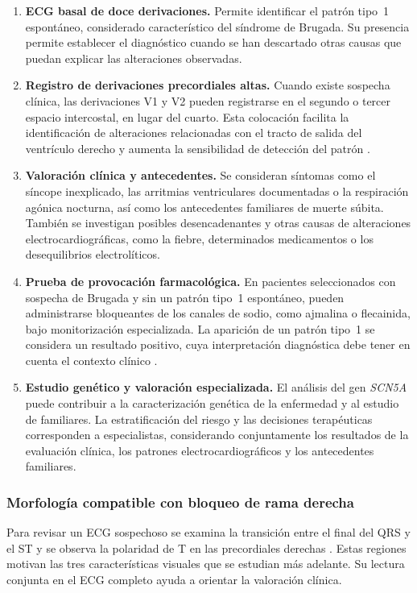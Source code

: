 \begin{enumerate}
  \item \textbf{ECG basal de doce derivaciones.} Permite identificar el patrón tipo~1 espontáneo, considerado característico del síndrome de Brugada. Su presencia permite establecer el diagnóstico cuando se han descartado otras causas que puedan explicar las alteraciones observadas.
  \item \textbf{Registro de derivaciones precordiales altas.} Cuando existe sospecha clínica, las derivaciones V1 y V2 pueden registrarse en el segundo o tercer espacio intercostal, en lugar del cuarto. Esta colocación facilita la identificación de alteraciones relacionadas con el tracto de salida del ventrículo derecho y aumenta la sensibilidad de detección del patrón \cite{zeppenfeld2022}.
  \item \textbf{Valoración clínica y antecedentes.} Se consideran síntomas como el síncope inexplicado, las arritmias ventriculares documentadas o la respiración agónica nocturna, así como los antecedentes familiares de muerte súbita. También se investigan posibles desencadenantes y otras causas de alteraciones electrocardiográficas, como la fiebre, determinados medicamentos o los desequilibrios electrolíticos.
  \item \textbf{Prueba de provocación farmacológica.} En pacientes seleccionados con sospecha de Brugada y sin un patrón tipo~1 espontáneo, pueden administrarse bloqueantes de los canales de sodio, como ajmalina o flecainida, bajo monitorización especializada. La aparición de un patrón tipo~1 se considera un resultado positivo, cuya interpretación diagnóstica debe tener en cuenta el contexto clínico \cite{wilde2023scbt}.
  \item \textbf{Estudio genético y valoración especializada.} El análisis del gen \emph{SCN5A} puede contribuir a la caracterización genética de la enfermedad y al estudio de familiares. La estratificación del riesgo y las decisiones terapéuticas corresponden a especialistas, considerando conjuntamente los resultados de la evaluación clínica, los patrones electrocardiográficos y los antecedentes familiares.
\end{enumerate}

\subsubsection{Morfología compatible con bloqueo de rama derecha}

Para revisar un ECG sospechoso se examina la transición entre el final del QRS y el ST y se observa la polaridad de T en las precordiales derechas \cite{zeppenfeld2022,wilde2023scbt}. Estas regiones motivan las tres características visuales que se estudian más adelante. Su lectura conjunta en el ECG completo ayuda a orientar la valoración clínica.

